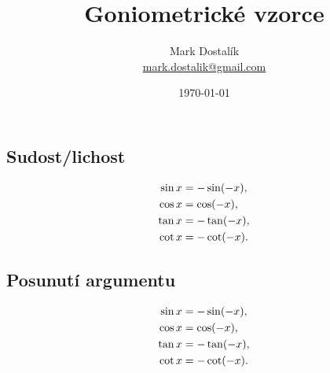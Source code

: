 \documentclass[columns=2]{cheatsheet}
\title{Goniometrické vzorce\footnotemark}
\author{Mark Dostal\'{i}k \\ \href{mailto:mark.dostalik@gmail.com}{mark.dostalik@gmail.com}}
\date{\today}
\begin{document}
\maketitle
{}
\subsection{Sudost/lichost}
\begin{align*}
  \sin x 
  &= 
  - \sin \parens{-x},
  \\
  \cos x
  &=
  \cos \parens{-x},
  \\
  \tan x
  &=
  - \tan \parens{-x},
  \\
  \cot x
  &=
  - \cot \parens{-x}.
\end{align*}

\subsection{Posunutí argumentu}
\begin{align*}
  \sin x 
  &= 
  - \sin \parens{-x},
  \\
  \cos x
  &=
  \cos \parens{-x},
  \\
  \tan x
  &=
  - \tan \parens{-x},
  \\
  \cot x
  &=
  - \cot \parens{-x}.
\end{align*}
\end{document}
